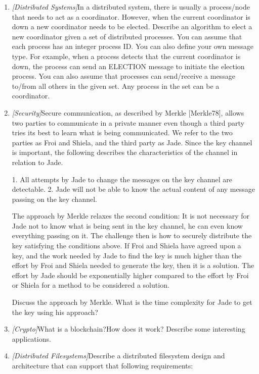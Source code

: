 \documentclass{article}
\begin{document}
\begin{enumerate}
  	\item{\textit{[Distributed Systems]}In a distributed system, there is usually a process/node that needs to act as a coordinator. However, when the current coordinator is down a new coordinator needs to be elected. Describe an algorithm to elect a new coordinator given a set of distributed processes. You can assume that each process has an integer process ID. You can  also define your own message type. For example, when a process detects that the current coordinator is down, the process can send an ELECTION message to initiate the election process. You can also assume that processes can send/receive a message to/from all others in the given set. Any process in the set can be a coordinator.}
  	
	\item{\textit{[Security]}Secure communication, as described by Merkle [Merkle78], allows two parties to communicate in a private manner even though a third party tries its best to learn what is being communicated. We refer to the two parties as Froi and Shiela, and the third party as Jade. Since the key channel is important, the following describes the characteristics of the channel in relation to Jade.

1. All attempts by Jade to change the messages on the key channel are detectable.
2. Jade will not be able to know the actual content of any message passing on the key channel.

The approach by Merkle relaxes the second condition: It is not necessary for Jade not to know what is being sent in the key channel, he can even know everything passing on it. The challenge then is how
to securely distribute the key satisfying the conditions above. If Froi and Shiela have agreed upon a key, and the work needed by Jade to find the key is much higher than the effort by Froi and Shiela needed
to generate the key, then it is a solution. The effort by Jade should be exponentially higher compared to the effort by Froi or Shiela for a method to be considered a solution.

Discuss the approach by Merkle. What is the time complexity for Jade to get the key using his approach?}  	

	\item{\textit{[Crypto]}What is a blockchain?How does it work? Describe some interesting applications.}
	
	\item{\textit{[Distributed Filesystems]}Describe a distributed filesystem design and architecture that can support that following requirements:

}
\end{enumerate}
\end{document}
